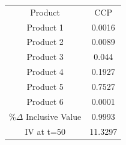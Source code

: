 \begin{tabular}{cc}
Product & CCP \\
Product 1 & 0.0016 \\
Product 2 & 0.0089 \\
Product 3 & 0.044 \\
Product 4 & 0.1927 \\
Product 5 & 0.7527 \\
Product 6 & 0.0001 \\
$\%\Delta$ Inclusive Value & 0.9993 \\
IV at t=50 & 11.3297 \\
\end{tabular}